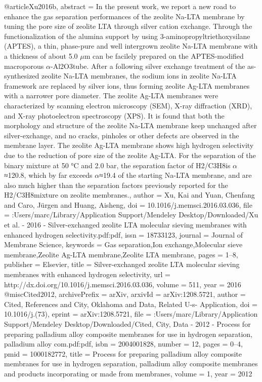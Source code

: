 @article{Xu2016b,
abstract = {In the present work, we report a new road to enhance the gas separation performances of the zeolite Na-LTA membrane by tuning the pore size of zeolite LTA through silver cation exchange. Through the functionalization of the alumina support by using 3-aminopropyltriethoxysilane (APTES), a thin, phase-pure and well intergrown zeolite Na-LTA membrane with a thickness of about 5.0 $\mu$m can be facilely prepared on the APTES-modified macroporous $\alpha$-Al2O3tube. After a following silver exchange treatment of the as-synthesized zeolite Na-LTA membranes, the sodium ions in zeolite Na-LTA framework are replaced by silver ions, thus forming zeolite Ag-LTA membranes with a narrower pore diameter. The zeolite Ag-LTA membranes were characterized by scanning electron microscopy (SEM), X-ray diffraction (XRD), and X-ray photoelectron spectroscopy (XPS). It is found that both the morphology and structure of the zeolite Na-LTA membrane keep unchanged after silver-exchange, and no cracks, pinholes or other defects are observed in the membrane layer. The zeolite Ag-LTA membrane shows high hydrogen selectivity due to the reduction of pore size of the zeolite Ag-LTA. For the separation of the binary mixture at 50 °C and 2.0 bar, the separation factor of H2/C3H8is $\alpha$≈120.8, which by far exceeds $\alpha$≈19.4 of the starting Na-LTA membrane, and are also much higher than the separation factors previously reported for the H2/C3H8mixture on zeolite membranes.},
author = {Xu, Kai and Yuan, Chenfang and Caro, J{\"{u}}rgen and Huang, Aisheng},
doi = {10.1016/j.memsci.2016.03.036},
file = {:Users/marc/Library/Application Support/Mendeley Desktop/Downloaded/Xu et al. - 2016 - Silver-exchanged zeolite LTA molecular sieving membranes with enhanced hydrogen selectivity.pdf:pdf},
issn = {18733123},
journal = {Journal of Membrane Science},
keywords = {Gas separation,Ion exchange,Molecular sieve membrane,Zeolite Ag-LTA membrane,Zeolite LTA membrane},
pages = {1--8},
publisher = {Elsevier},
title = {{Silver-exchanged zeolite LTA molecular sieving membranes with enhanced hydrogen selectivity}},
url = {http://dx.doi.org/10.1016/j.memsci.2016.03.036},
volume = {511},
year = {2016}
}
@misc{Cited2012,
archivePrefix = {arXiv},
arxivId = {arXiv:1208.5721},
author = {Cited, References and City, Oklahoma and Data, Related U-s- Application},
doi = {10.1016/j.(73)},
eprint = {arXiv:1208.5721},
file = {:Users/marc/Library/Application Support/Mendeley Desktop/Downloaded/Cited, City, Data - 2012 - Process for preparing palladium alloy composite membranes for use in hydrogen separation, palladium alloy com.pdf:pdf},
isbn = {2004001828},
number = {12},
pages = {0--4},
pmid = {1000182772},
title = {{Process for preparing palladium alloy composite membranes for use in hydrogen separation, palladium alloy composite membranes and products incorporating or made from membranes}},
volume = {1},
year = {2012}
}
